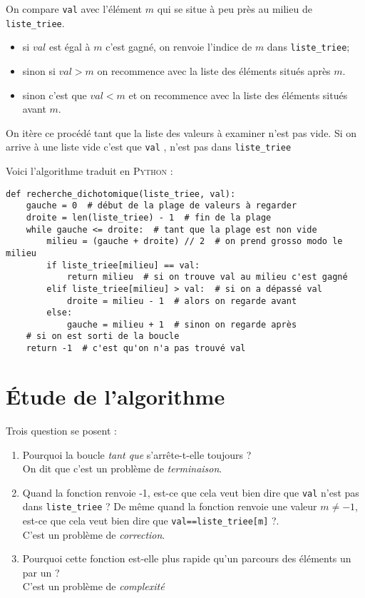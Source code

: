 \begin{methode}[]
On compare \texttt{val} avec l'élément $m$ qui se situe \og à peu près au milieu de \texttt{liste_triee}\fg{}.
\begin{itemize}
    \item   si $val$ est égal à $m$ c'est gagné, on renvoie l'indice de $m$ dans  \texttt{liste_triee};
    \item   sinon si $val>m$ on recommence avec la liste des éléments situés après $m$.
    \item   sinon c'est que $val<m$ et on recommence avec la liste des éléments situés avant $m$.
\end{itemize}
On itère ce procédé tant que la liste des valeurs à examiner n'est pas vide. Si on arrive à une liste vide c'est que \texttt{val} , n'est pas dans \texttt{liste_triee}
\end{methode}
Voici l'algorithme traduit en \textsc{Python} :
\begin{pys}
\begin{verbatim}
def recherche_dichotomique(liste_triee, val):
    gauche = 0  # début de la plage de valeurs à regarder
    droite = len(liste_triee) - 1  # fin de la plage
    while gauche <= droite:  # tant que la plage est non vide
        milieu = (gauche + droite) // 2  # on prend grosso modo le milieu
        if liste_triee[milieu] == val:
            return milieu  # si on trouve val au milieu c'est gagné
        elif liste_triee[milieu] > val:  # si on a dépassé val
            droite = milieu - 1  # alors on regarde avant
        else:
            gauche = milieu + 1  # sinon on regarde après
    # si on est sorti de la boucle
    return -1  # c'est qu'on n'a pas trouvé val
\end{verbatim}
\end{pys}

\section{\'Etude de l'algorithme}

Trois question se posent :

\begin{enumerate}
    \item   Pourquoi la boucle \textit{tant que} s'arrête-t-elle toujours ?\\ On dit que c'est un problème de \textit{terminaison}.
    \item   Quand la fonction renvoie -1, est-ce que cela veut bien dire que \texttt{val} n'est pas dans \texttt{liste_triee} ? De même quand la fonction renvoie une valeur $m\neq -1$, est-ce que cela veut bien dire que \texttt{val==liste_triee[m]} ?.\\
    C'est un problème de \textit{correction}.
    \item   Pourquoi cette fonction est-elle plus rapide qu'un parcours des éléments un par un ?\\ C'est un problème de \textit{complexité}
\end{enumerate}

